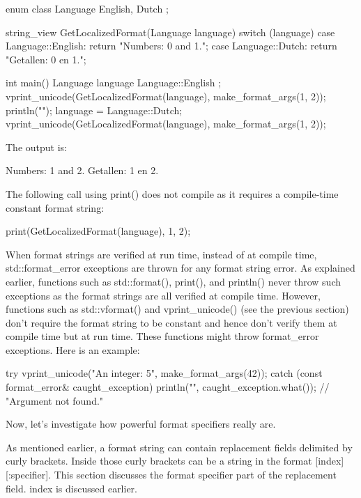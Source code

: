 \begin{cpp}
enum class Language { English, Dutch };

string_view GetLocalizedFormat(Language language)
{
    switch (language) {
        case Language::English: return "Numbers: {0} and {1}.";
        case Language::Dutch: return "Getallen: {0} en {1}.";
    }
}

int main()
{
    Language language { Language::English };
    vprint_unicode(GetLocalizedFormat(language), make_format_args(1, 2));
    println("");
    language = Language::Dutch;
    vprint_unicode(GetLocalizedFormat(language), make_format_args(1, 2));
}
\end{cpp}

The output is:

\begin{shell}
Numbers: 1 and 2.
Getallen: 1 en 2.
\end{shell}

The following call using print() does not compile as it requires a compile-time constant format string:

\begin{cpp}
print(GetLocalizedFormat(language), 1, 2);
\end{cpp}


When format strings are verified at run time, instead of at compile time, std::format\_error exceptions are thrown for any format string error. As explained earlier, functions such as std::format(), print(), and println() never throw such exceptions as the format strings are all verified at compile time. However, functions such as std::vformat() and vprint\_unicode() (see the previous section) don’t require the format string to be constant and hence don’t verify them at compile time but at run time. These functions might throw format\_error exceptions. Here is an example:

\begin{cpp}
try {
    vprint_unicode("An integer: {5}", make_format_args(42));
} catch (const format_error& caught_exception) {
    println("{}", caught_exception.what()); // "Argument not found."
}
\end{cpp}

Now, let’s investigate how powerful format specifiers really are.


As mentioned earlier, a format string can contain replacement fields delimited by curly brackets. Inside those curly brackets can be a string in the format [index][:specifier]. This section discusses the format specifier part of the replacement field. index is discussed earlier.

